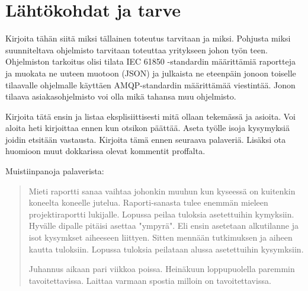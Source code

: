 \chapter{Lähtökohdat ja tarve}
\label{ch:lähtökohdat ja tarve}
Kirjoita tähän siitä miksi tällainen toteutus tarvitaan ja miksi. Pohjusta miksi suunniteltava ohjelmisto tarvitaan toteuttaa yritykseen johon työn teen. Ohjelmiston tarkoitus olisi tilata IEC 61850 -standardin määrittämiä raportteja ja muokata ne uuteen muotoon (JSON) ja julkaista ne eteenpäin jonoon toiselle tilaavalle ohjelmalle käyttäen AMQP-standardin määrittämää viestintää. Jonon tilaava asiakasohjelmisto voi olla mikä tahansa muu ohjelmisto.

Kirjoita tätä ensin ja listaa eksplisiittisesti mitä ollaan tekemässä ja asioita. Voi aloita heti kirjoittaa ennen kun otsikon päättää. Aseta työlle isoja kysymyksiä joidin etsitään vastausta. Kirjoita tämä ennen seuraava palaveriä. Lisäksi ota huomioon muut dokkarissa olevat kommentit proffalta.

Muistiinpanoja palaverista:
\begin{quote}
Mieti raportti sanaa vaihtaa johonkin muuhun kun kyseessä on kuitenkin koneelta koneelle jutelua. Raporti-sanasta tulee enemmän mieleen projektiraportti lukijalle. Lopussa peilaa tuloksia asetettuihin kymyksiin. Hyvälle dipalle pitäisi asettaa "ympyrä". Eli ensin asetetaan alkutilanne ja isot kysymkset aiheeseen liittyen. Sitten mennään tutkimuksen ja aiheen kautta tuloksiin. Lopussa tuloksia peilataan alussa asetettuihin kysymksiin.

Juhannus aikaan pari viikkoa poissa. Heinäkuun loppupuolella paremmin tavoitettavissa. Laittaa varmaan spostia milloin on tavoitettavissa.
\end{quote}


